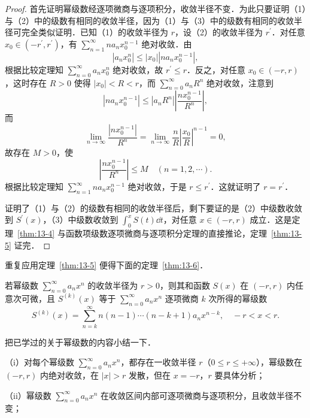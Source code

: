 \begin{proof}
首先证明幂级数经逐项微商与逐项积分，收敛半径不变．为此只要证明（1）与（2）中的级数有相同的收敛半径，因为（1）与（3）中的级数有相同的收敛半径可完全类似证明．已知（1）的收敛半径为 $r$，设（2）的收敛半径为 $r^{\prime}$．对任意 $x_{0}\in(-r^{\prime},r^{\prime})$，有 $\displaystyle\sum_{n=1}^{\infty}na_{n}x_{0}^{n-1}$ 绝对收敛．由
\[
\left|a_{n}x_{0}^{n}\right|\leqslant\left|x_{0}\right|\left|na_{n}x_{0}^{n-1}\right|,
\]
根据比较定理知 $\displaystyle\sum_{n=0}^{\infty}a_{n}x_{0}^{n}$ 绝对收敛，故 $r^{\prime}\leqslant r$．反之，对任意 $x_{0}\in(-r,r)$，这时存在 $R>0$ 使得 $\left|x_{0}\right|<R<r$，而 $\displaystyle\sum_{n=0}^{\infty}a_{n}R^{n}$ 绝对收敛，注意到
\[
\left|na_{n}x_{0}^{n-1}\right|\leqslant\left|a_{n}R^{n}\right|\left|\frac{nx_{0}^{n-1}}{R^{n}}\right|,
\]
而
\[
\lim_{n\to\infty}\frac{\left|nx_{0}^{n-1}\right|}{R^{n}}=\lim_{n\to\infty}\frac{n}{R}\left|\frac{x_{0}}{R}\right|^{n-1}=0,
\]
故存在 $M>0$，使
\[
\left|\frac{nx_{0}^{n-1}}{R^{n}}\right|\leqslant M\quad(n=1,2,\cdots).
\]
根据比较定理知 $\displaystyle\sum_{n=1}^{\infty}na_{n}x_{0}^{n-1}$ 绝对收敛，于是 $r\leqslant r^{\prime}$．这就证明了 $r=r^{\prime}$．

证明了（1）与（2）的级数有相同的收敛半径后，剩下要证的是（2）中级数收敛到 $S^{\prime}(x)$，（3）中级数收敛到 $\displaystyle\int_{0}^{x}S(t)\dd t$，对任意 $x\in(-r,r)$ 成立．这是定理~\ref{thm:13-4} 与函数项级数逐项微商与逐项积分定理的直接推论，定理~\ref{thm:13-5} 证完．
\end{proof}

重复应用定理~\ref{thm:13-5} 便得下面的定理~\ref{thm:13-6}．

\begin{theorem}\label{thm:13-6}
若幂级数 $\displaystyle\sum_{n=0}^{\infty}a_{n}x^{n}$ 的收敛半径为 $r>0$，则其和函数 $S(x)$ 在 $(-r,r)$ 内任意次可微，且 $S^{(k)}(x)$ 等于 $\displaystyle\sum_{n=0}^{\infty}a_{n}x^{n}$ 逐项微商 $k$ 次所得的幂级数
\[
S^{(k)}(x)=\sum_{n=k}^{\infty}n(n-1)\cdots(n-k+1)a_{n}x^{n-k},\quad -r<x<r.
\]
\end{theorem}

把已学过的关于幂级数的内容小结一下．

（i）对每个幂级数 $\displaystyle\sum_{n=0}^{\infty}a_{n}x^{n}$，都存在一收敛半径 $r$（$0\leqslant r\leqslant+\infty$），幂级数在 $(-r,r)$ 内绝对收敛，在 $\left|x\right|>r$ 发散，但在 $x=-r$，$r$ 要具体分析；

（ii）幂级数 $\displaystyle\sum_{n=0}^{\infty}a_{n}x^{n}$ 在收敛区间内部可逐项微商与逐项积分，且收敛半径不变；

